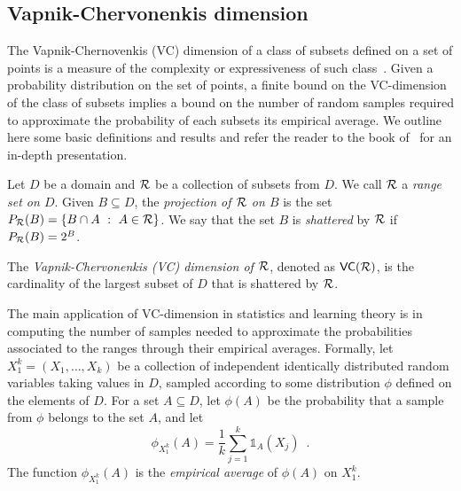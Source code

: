 \subsection{Vapnik-Chervonenkis dimension}\label{sec:prelvcdim}
The Vapnik-Chernovenkis (VC) dimension of a class of subsets defined
on a set of points is a measure of the complexity or expressiveness of such
class~\citep{VapnikC71}. Given a probability distribution on the set of points,
a finite bound on the VC-dimension of the class of subsets implies a bound on
the number of random samples required to approximate the probability of each
subsets its empirical average. We outline here some basic definitions and
results and refer the reader to the book of~\citet{MohriRT12} for an in-depth
presentation.

Let $D$ be a domain and $\mathcal{R}$ be a collection of subsets from $D$. We call
$\mathcal{R}$ a \emph{range set on $D$}.
Given $B\subseteq D$, the \emph{projection of $\mathcal{R}$ on $B$} is the set 
$P_{\mathcal{R}}(B)=\{ B\cap A ~:~ A\in\mathcal{R}\}$. We say that the set $B$ is
\emph{shattered} by $\mathcal{R}$ if $P_{\mathcal{R}}(B)=2^B$.

\begin{definition}\label{def:vcdim}
  The \emph{Vapnik-Chervonenkis (VC) dimension of $\mathcal{R}$}, denoted as
  $\mathsf{VC}(\mathcal{R})$, is the cardinality of the largest subset of $D$ that is
  shattered by $\mathcal{R}$.
\end{definition}

The main application of VC-dimension in statistics and learning
theory is in computing the number of samples needed to approximate the
probabilities associated to the ranges through their empirical averages.
Formally, let $X_1^k=(X_1,\dotsc,X_k)$ be a collection of independent
identically distributed random variables taking values in $D$, sampled 
according to some distribution $\phi$ defined on the elements of $D$.
For a set $A\subseteq D$, let $\phi(A)$ be the probability that a sample from
$\phi$ belongs to the set $A$, and let
\[
\phi_{X_1^k}(A)=\frac{1}{k}\sum_{j=1}^k\mathds{1}_A(X_j)\enspace.%
\]
The function
$\phi_{X_1^k}(A)$ is the \emph{empirical average} of $\phi(A)$ on $X_1^k$.

